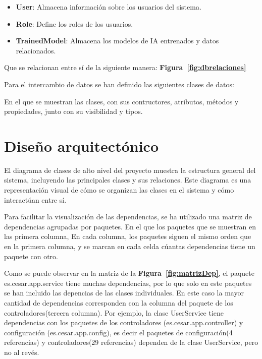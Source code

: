 \begin{itemize}
    \item \textbf{User}: Almacena información sobre los usuarios del sistema.
    \item \textbf{Role}: Define los roles de los usuarios.
    \item \textbf{TrainedModel}: Almacena los modelos de IA entrenados y datos relacionados.
\end{itemize}
Que se relacionan entre sí de la siguiente manera: \textbf{Figura~\ref{fig:dbrelaciones}}

Para el intercambio de datos se han definido las siguientes clases de datos:

En el que se muestran las clases, con sus contructores, atributos, métodos y propiedades, junto con su visibilidad y tipos.

\section{Diseño arquitectónico}

El diagrama de clases de alto nivel del proyecto muestra la estructura general del sistema, incluyendo las principales clases y sus relaciones. Este diagrama es una representación visual de cómo se organizan las clases en el sistema y cómo interactúan entre sí.

Para facilitar la visualización de las dependencias, se ha utilizado una matriz de dependencias agrupadas por paquetes. En el que los paquetes que se muestran en las primera columna, 
En cada columna, los paquetes siguen el mismo orden que en la primera columna, y se marcan en cada celda cúantas dependencias tiene un paquete con otro.

Como se puede observar en la matriz de la \textbf{Figura~\ref{fig:matrizDep}}, el paquete es.cesar.app.service tiene muchas dependencias, por lo que solo en este paquetes se han incluido las depencias de las clases individuales. En este caso la mayor cantidad de dependencias corresponden con la columna del paquete de los controladores(tercera columna). Por ejemplo, la clase UserService tiene dependencias con los paquetes de los controladores (es.cesar.app.controller) y configuración (es.cesar.app.config), es decir el paquetes de configuración(4 referencias) y controladores(29 referencias) dependen de la clase UserService, pero no al revés.

